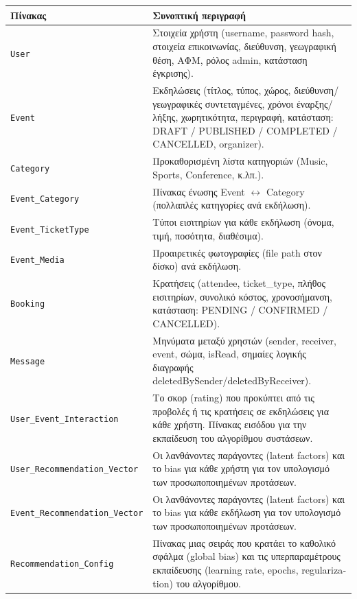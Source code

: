 \documentclass[12pt]{fphw}
\newcommand{\en}[1]{\foreignlanguage{english}{#1}}
\begin{document}
\vspace{-0.25cm}
\begin{table}[H]
    \centering
    \small
    \begin{tabularx}{\textwidth}{lX}
    \toprule
    \textbf{Πίνακας} & \textbf{Συνοπτική περιγραφή} \\
    \midrule
    \en{\texttt{User}} & Στοιχεία χρήστη (\en{username, password hash}, στοιχεία επικοινωνίας, διεύθυνση, γεωγραφική θέση, ΑΦΜ, ρόλος \en{admin}, κατάσταση έγκρισης). \\
    \addlinespace[1pt]
    \en{\texttt{Event}} & Εκδηλώσεις (τίτλος, τύπος, χώρος, διεύθυνση/γεωγραφικές συντεταγμένες, χρόνοι έναρξης/λήξης, χωρητικότητα, περιγραφή, κατάσταση: \en{DRAFT / PUBLISHED / COMPLETED / CANCELLED, organizer}). \\
    \addlinespace[1pt]
    \en{\texttt{Category}} & Προκαθορισμένη λίστα κατηγοριών (\en{Music, Sports, Conference}, κ.λπ.). \\
    \addlinespace[1pt]
    \en{\texttt{Event\_Category}} & Πίνακας ένωσης \en{Event} $\leftrightarrow$ \en{Category} (πολλαπλές κατηγορίες ανά εκδήλωση). \\
    \addlinespace[1pt]
    \en{\texttt{Event\_TicketType}} & Τύποι εισιτηρίων για κάθε εκδήλωση (όνομα, τιμή, ποσότητα, διαθέσιμα). \\
    \addlinespace[1pt]
    \en{\texttt{Event\_Media}} & Προαιρετικές φωτογραφίες (\en{file path} στον δίσκο) ανά εκδήλωση. \\
    \addlinespace[1pt]
    \en{\texttt{Booking}} & Κρατήσεις (\en{attendee, ticket\_type}, πλήθος εισιτηρίων, συνολικό κόστος, χρονοσήμανση, κατάσταση: \en{PENDING / CONFIRMED / CANCELLED}). \\
    \addlinespace[1pt]
    \en{\texttt{Message}} & Μηνύματα μεταξύ χρηστών (\en{sender, receiver, event}, σώμα, \en{isRead}, σημαίες λογικής διαγραφής \en{deletedBySender/deletedByReceiver}). \\
    \addlinespace[1pt]
    \en{\texttt{User\_Event\_Interaction}} & Το σκορ (\en{rating}) που προκύπτει από τις προβολές ή τις κρατήσεις σε εκδηλώσεις για κάθε χρήστη. Πίνακας εισόδου για την εκπαίδευση του αλγορίθμου συστάσεων. \\
    \addlinespace[1pt]
    \en{\texttt{User\_Recommendation\_Vector}} & Οι λανθάνοντες παράγοντες (\en{latent factors}) και το \en{bias} για κάθε χρήστη για τον υπολογισμό των προσωποποιημένων προτάσεων. \\
    \addlinespace[1pt]
    \en{\texttt{Event\_Recommendation\_Vector}} & Οι λανθάνοντες παράγοντες (\en{latent factors}) και το \en{bias} για κάθε εκδήλωση για τον υπολογισμό των προσωποποιημένων προτάσεων. \\
    \addlinespace[1pt]
    \en{\texttt{Recommendation\_Config}} & Πίνακας μιας σειράς που κρατάει το καθολικό σφάλμα (\en{global bias}) και τις υπερπαραμέτρους εκπαίδευσης (\en{learning rate, epochs, regularization}) του αλγορίθμου. \\
    \bottomrule
    \end{tabularx}
\end{table}
\end{document}
